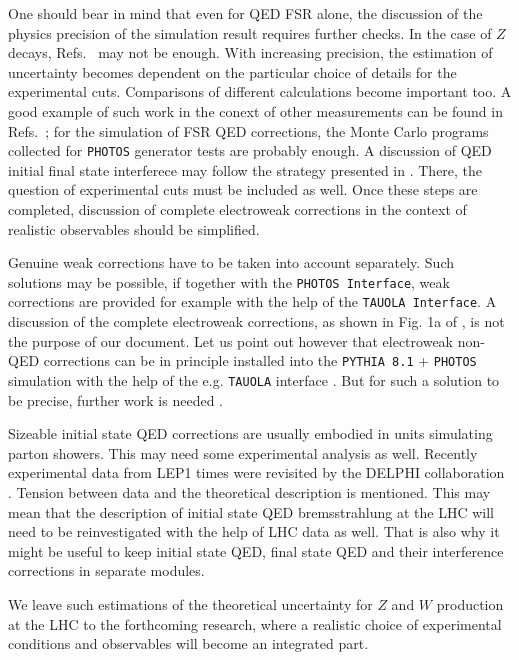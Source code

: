 \documentclass[]{Photos_interface_design}
\begin{document}
One should bear in mind that even for QED FSR alone, the discussion of the physics 
precision of the simulation result requires further checks. In the case of 
$Z$ decays, Refs.~\cite{Golonka:2005pn,Golonka:2006tw} may not be enough.
With increasing precision, the estimation of uncertainty becomes dependent on 
the particular choice of details for the experimental cuts. Comparisons of different
calculations become important too. A good example of such work in the conext of 
other measurements can be found in Refs.~\cite{Jadach:1995pd,Arbuzov:1996eq}; 
for the simulation of 
FSR QED corrections, the Monte Carlo programs collected for {\tt PHOTOS} generator 
tests are probably enough. 
A discussion of QED initial final state interferece may follow the strategy presented
in \cite{Jadach:1999gz}. There, the question of experimental cuts must be included 
as well. Once these steps are completed, discussion 
of complete electroweak corrections in the context of realistic observables should 
be simplified.



Genuine weak corrections have to be taken into account separately.
Such solutions may be possible,  if together with the {\tt PHOTOS Interface},
 weak corrections are provided for example with the help of the {\tt TAUOLA Interface}.
A discussion
of the complete electroweak corrections, as shown in Fig. 1a of  \cite{Adam:2008ge},
is not the purpose of our document. Let us point out however that electroweak 
non-QED corrections can be in principle installed into the {\tt PYTHIA 8.1} + {\tt PHOTOS} simulation with 
the help of the e.g. {\tt TAUOLA} interface \cite{Davidson:2010rw}.
But for such a solution to be precise, further work is needed \cite{Bardin-private}.

Sizeable initial state QED corrections are usually embodied in  units 
simulating parton showers. This may need some experimental analysis as well. 
Recently experimental data from LEP1 times were revisited by the DELPHI collaboration \cite{Abdallah:2010tk}.
Tension between data and the theoretical description is 
mentioned. This may mean that the description of initial state QED bremsstrahlung 
at the LHC will need to be reinvestigated with the help of LHC data as well.
That is also why it  might be useful to keep initial state QED, final state QED and their interference corrections in separate modules. 

We leave such estimations of the theoretical uncertainty for $Z$ and $W$ 
production at the LHC 
to the forthcoming research, where a realistic choice of experimental conditions and
observables 
will become an integrated part. 
\end{document}
